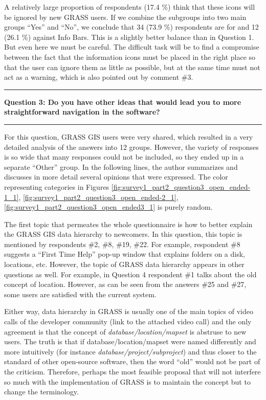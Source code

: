 \documentclass[a4paper,10pt,twoside]{article}
\begin{document}
\noindent A relatively large proportion of respondents (17.4 \%) think that these icons will be ignored by new GRASS users. If we combine the subgroups into two main groups ``Yes'' and ``No'', we conclude that 34 (73.9 \%) respondents are for and 12 (26.1 \%) against Info Bars. This is a slightly better balance than in Question 1. But even here we must be careful. The difficult task will be to find a compromise between the fact that the information icons must be placed in the right place so that the user can ignore them as little as possible, but at the same time must not act as a warning, which is also pointed out by comment \#3.

\par\noindent\rule{\textwidth}{0.4pt}
\noindent \textbf{Question 3: Do you have other ideas that would lead you to more straightforward navigation in the software?}
\par\noindent\rule{\textwidth}{0.4pt}
\noindent For this question, GRASS GIS users were very shared, which resulted in a very detailed analysis of the answers into 12 groups. However, the variety of responses is so wide that many responses could not be included, so they ended up in a separate ``Other'' group. In the following lines, the author summarizes and discusses in more detail several opinions that were expressed. The color representing categories in Figures \ref{fig:survey1_part2_question3_open_ended-1_1}, \ref{fig:survey1_part2_question3_open_ended-2_1}, \ref{fig:survey1_part2_question3_open_ended3_1} is purely random.

The first topic that permeates the whole questionnaire is how to better explain the GRASS GIS data hierarchy to newcomers. In this question, this topic is mentioned by respondents \#2, \#8, \#19, \#22. For example, respondent \#8 suggests a ``First Time Help'' pop-up window that explains folders on a disk, locations, etc. However, the topic of GRASS data hierarchy appears in other questions as well. For example, in Question 4 respondent \#1 talks about the old concept of location. However, as can be seen from the answers \#25 and \#27, some users are satisfied with the current system.

Either way, data hierarchy in GRASS is usually one of the main topics of video calls of the developer community (link to the attached video call) and the only agreement is that the concept of \textit{database/location/mapset} is abstruse to new users. The truth is that if database/location/mapset were named differently and more intuitively (for instance \textit{database/project/subproject}) and thus closer to the standard of other open-source software, then the word ``old'' would not be part of the criticism. Therefore, perhaps the most feasible proposal that will not interfere so much with the implementation of GRASS is to maintain the concept but to change the terminology.
\end{document}
